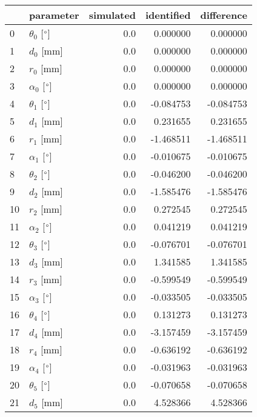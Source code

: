 \documentclass{standalone}%
\begin{document}
%
\normalsize%
\begin{tabular}{llrrr}
\toprule
{} &                 parameter & simulated & identified & difference \\
\midrule
0  &  $\theta_{0}$ [$\degree$] &       0.0 &   0.000000 &   0.000000 \\
1  &              $d_{0}$ [mm] &       0.0 &   0.000000 &   0.000000 \\
2  &              $r_{0}$ [mm] &       0.0 &   0.000000 &   0.000000 \\
3  &  $\alpha_{0}$ [$\degree$] &       0.0 &   0.000000 &   0.000000 \\
4  &  $\theta_{1}$ [$\degree$] &       0.0 &  -0.084753 &  -0.084753 \\
5  &              $d_{1}$ [mm] &       0.0 &   0.231655 &   0.231655 \\
6  &              $r_{1}$ [mm] &       0.0 &  -1.468511 &  -1.468511 \\
7  &  $\alpha_{1}$ [$\degree$] &       0.0 &  -0.010675 &  -0.010675 \\
8  &  $\theta_{2}$ [$\degree$] &       0.0 &  -0.046200 &  -0.046200 \\
9  &              $d_{2}$ [mm] &       0.0 &  -1.585476 &  -1.585476 \\
10 &              $r_{2}$ [mm] &       0.0 &   0.272545 &   0.272545 \\
11 &  $\alpha_{2}$ [$\degree$] &       0.0 &   0.041219 &   0.041219 \\
12 &  $\theta_{3}$ [$\degree$] &       0.0 &  -0.076701 &  -0.076701 \\
13 &              $d_{3}$ [mm] &       0.0 &   1.341585 &   1.341585 \\
14 &              $r_{3}$ [mm] &       0.0 &  -0.599549 &  -0.599549 \\
15 &  $\alpha_{3}$ [$\degree$] &       0.0 &  -0.033505 &  -0.033505 \\
16 &  $\theta_{4}$ [$\degree$] &       0.0 &   0.131273 &   0.131273 \\
17 &              $d_{4}$ [mm] &       0.0 &  -3.157459 &  -3.157459 \\
18 &              $r_{4}$ [mm] &       0.0 &  -0.636192 &  -0.636192 \\
19 &  $\alpha_{4}$ [$\degree$] &       0.0 &  -0.031963 &  -0.031963 \\
20 &  $\theta_{5}$ [$\degree$] &       0.0 &  -0.070658 &  -0.070658 \\
21 &              $d_{5}$ [mm] &       0.0 &   4.528366 &   4.528366 \\

\end{tabular}
\end{document}
